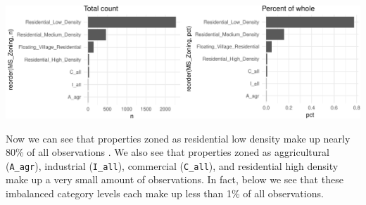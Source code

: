 \documentclass[]{article}
\newenvironment{Shaded}{\begin{snugshade}}{\end{snugshade}}
\newcommand{\KeywordTok}[1]{\textcolor[rgb]{0.13,0.29,0.53}{\textbf{#1}}}
\newcommand{\DataTypeTok}[1]{\textcolor[rgb]{0.13,0.29,0.53}{#1}}
\newcommand{\DecValTok}[1]{\textcolor[rgb]{0.00,0.00,0.81}{#1}}
\newcommand{\StringTok}[1]{\textcolor[rgb]{0.31,0.60,0.02}{#1}}
\newcommand{\CommentTok}[1]{\textcolor[rgb]{0.56,0.35,0.01}{\textit{#1}}}
\newcommand{\OperatorTok}[1]{\textcolor[rgb]{0.81,0.36,0.00}{\textbf{#1}}}
\newcommand{\NormalTok}[1]{#1}
\begin{document}
\begin{Shaded}
\end{Shaded}

\begin{center}\includegraphics{Chapter_3_-_Visualization_files/figure-latex/bar2-1} \end{center}

Now we can see that properties zoned as residential low density make up
nearly 80\% of all observations . We also see that properties zoned as
aggricultural (\texttt{A\_agr}), industrial (\texttt{I\_all}),
commercial (\texttt{C\_all}), and residential high density make up a
very small amount of observations. In fact, below we see that these
imbalanced category levels each make up less than 1\% of all
observations.
\end{document}
